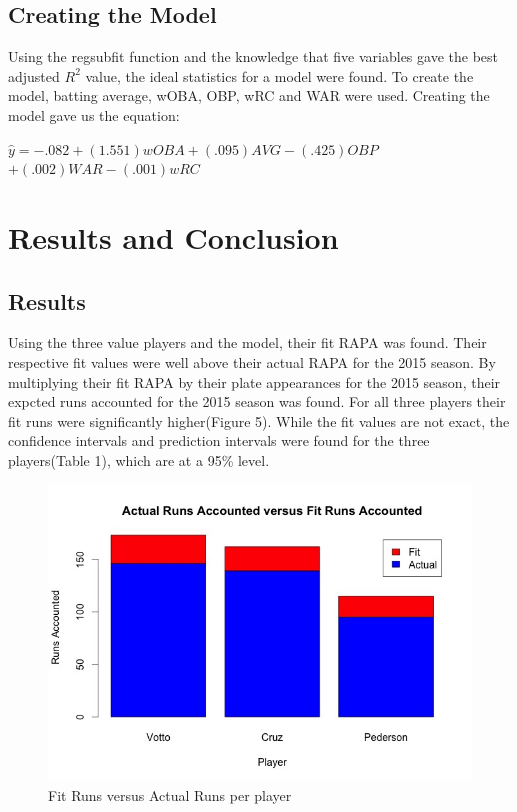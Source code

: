 \documentclass[12pt]{article}
\begin{document}
\subsection{Creating the Model}
Using the regsubfit function and the knowledge that five variables gave the best adjusted $R^2$ value, the ideal statistics for a model were found. To create the model, batting average, wOBA, OBP, wRC and WAR were used. Creating the model gave us the equation:
\begin{center}
$\hat{y} = -.082 + (1.551)wOBA + (.095)AVG -(.425)OBP$\\
 $+ (.002)WAR - (.001)wRC$
\end{center}

\section{Results and Conclusion}

\subsection{Results}
\qquad Using the three value players and the model, their fit RAPA was found. Their respective fit values were well above their actual RAPA for the 2015 season. By multiplying their fit RAPA by their plate appearances for the 2015 season, their expcted runs accounted for the 2015 season was found. For all three players their fit runs were significantly higher(Figure 5). While the fit values are not exact, the confidence intervals and prediction intervals were found for the three players(Table 1), which are at a 95\% level.

\begin{figure}[h]
\centering
\includegraphics[width=4.5in]{FitRuns.jpeg}
\caption{Fit Runs versus Actual Runs per player}
\end{figure}
\end{document}
